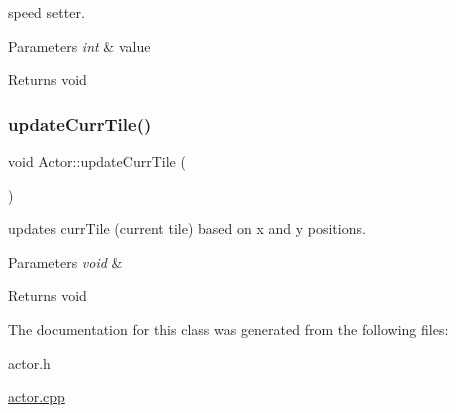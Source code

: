 speed setter. 


\begin{DoxyParams}{Parameters}
{\em int} & value \\
\hline
\end{DoxyParams}
\begin{DoxyReturn}{Returns}
void 
\end{DoxyReturn}
\mbox{\label{class_actor_a0e9374b0779e9b79af21278a4698a138}} 
\subsubsection{\texorpdfstring{update\+Curr\+Tile()}{updateCurrTile()}}
{\footnotesize\ttfamily void Actor\+::update\+Curr\+Tile (\begin{DoxyParamCaption}\item[{void}]{ }\end{DoxyParamCaption})}



updates curr\+Tile (current tile) based on x and y positions. 


\begin{DoxyParams}{Parameters}
{\em void} & \\
\hline
\end{DoxyParams}
\begin{DoxyReturn}{Returns}
void 
\end{DoxyReturn}


The documentation for this class was generated from the following files\+:\begin{DoxyCompactItemize}
\item 
actor.\+h\item 
\mbox{\hyperlink{actor_8cpp}{actor.\+cpp}}\end{DoxyCompactItemize}

